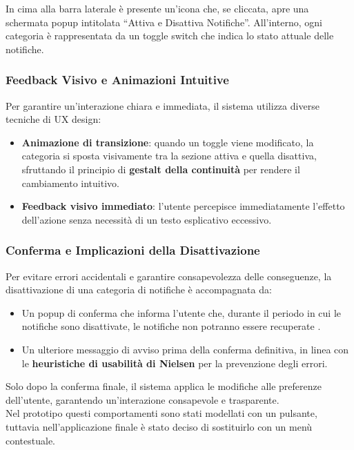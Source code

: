 In cima alla barra laterale è presente un’icona che, se cliccata, apre una schermata popup intitolata “Attiva e Disattiva Notifiche”. All’interno, ogni categoria è rappresentata da un toggle switch che indica lo stato attuale delle notifiche.

\vspace{0.5cm}
\subsubsection{Feedback Visivo e Animazioni Intuitive}
Per garantire un’interazione chiara e immediata, il sistema utilizza diverse tecniche di UX design:
\begin{itemize}
    \item \textbf{Animazione di transizione}: quando un toggle viene modificato, la categoria si sposta visivamente tra la sezione attiva e quella disattiva, sfruttando il principio di \textbf{gestalt della continuità} \cite{miller1956} per rendere il cambiamento intuitivo.
    \item \textbf{Feedback visivo immediato}: l’utente percepisce immediatamente l’effetto dell’azione senza necessità di un testo esplicativo eccessivo.
\end{itemize}

\newpage
\subsubsection{Conferma e Implicazioni della Disattivazione}
Per evitare errori accidentali e garantire consapevolezza delle conseguenze, la disattivazione di una categoria di notifiche è accompagnata da:
\begin{itemize}
    \item Un popup di conferma che informa l’utente che, durante il periodo in cui le notifiche sono disattivate, le notifiche non potranno essere recuperate \cite{wickens2008}.
    \item Un ulteriore messaggio di avviso prima della conferma definitiva, in linea con le \textbf{heuristiche di usabilità di Nielsen} \cite{nielsen1995} per la prevenzione degli errori.
\end{itemize}

Solo dopo la conferma finale, il sistema applica le modifiche alle preferenze dell'utente, garantendo un'interazione consapevole e trasparente.\\
Nel prototipo questi comportamenti sono stati modellati con un pulsante, tuttavia nell'applicazione finale è stato deciso di sostituirlo con un menù contestuale.



